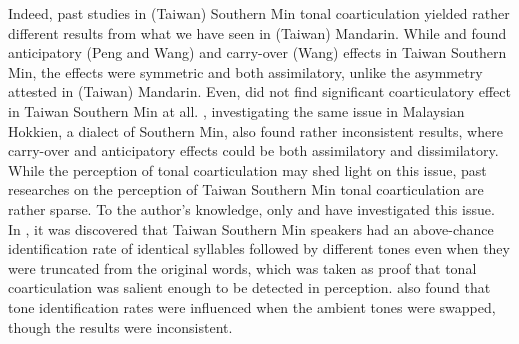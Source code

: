 Indeed, past studies in (Taiwan) Southern Min tonal coarticulation yielded rather different results from what we have seen in (Taiwan) Mandarin. While \cite{Peng1997} and \cite{Wang2002} found anticipatory (Peng and Wang) and carry-over (Wang) effects in Taiwan Southern Min, the effects were symmetric and both assimilatory, unlike the asymmetry attested in (Taiwan) Mandarin. Even, \cite{Lin1988} did not find significant coarticulatory effect in Taiwan Southern Min at all. \cite{ChangHsieh2012}, investigating the same issue in Malaysian Hokkien, a dialect of Southern Min, also found rather inconsistent results, where carry-over and anticipatory effects could be both assimilatory and dissimilatory. While the perception of tonal coarticulation may shed light on this issue, past researches on the perception of Taiwan Southern Min tonal coarticulation are rather sparse. To the author's knowledge, only \cite{Peng1997} and \cite{Wang2002} have investigated this issue. In \cite{Peng1997}, it was discovered that Taiwan Southern Min speakers had an above-chance identification rate of identical syllables followed by different tones even when they were truncated from the original words, which was taken as proof that tonal coarticulation was salient enough to be detected in perception. \cite{Wang2002} also found that tone identification rates were influenced when the ambient tones were swapped, though the results were inconsistent.

